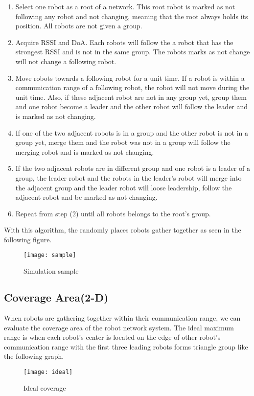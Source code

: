 \begin{enumerate}
	\item Select one robot as a root of a network. This root robot is marked as not following any robot and not changing, meaning that the root always holds its position. All robots are not given a group.
	\item Acquire RSSI and DoA. Each robots will follow the a robot that has the strongest RSSI and is not in the same group. The robots marks as not change will not change a following robot.
	\item Move robots towards a following robot for a unit time. If a robot is within a communication range of a following robot, the robot will not move during the unit time. Also, if these adjacent robot are not in any group yet, group them and one robot become a leader and the other robot will follow the leader and is marked as not changing.
	\item If one of the two adjacent robots is in a group and the other robot is not in a group yet, merge them and the robot was not in a group will follow the merging robot and is  marked as not changing.
	\item If the two adjacent robots are in different group and one robot is a leader of a group, the leader robot and the robots in the leader's robot will merge into the adjacent group and the leader robot will loose leadership, follow the adjacent robot and be marked as not changing.
	\item Repeat from step (2) until all robots belongs to the root's group.
\end{enumerate}

\par
With this algorithm, the randomly places robots gather together as seen in the following figure.
	
\begin{figure}[ht]
	\centering
	\texttt{[image: sample]}
	\caption{Simulation sample}
	\end{figure}


\subsection{Coverage Area(2-D)}
\par
When robots are gathering together within their communication range, we can evaluate the coverage area of the robot network 
system. The ideal maximum range is when each robot's center is located on the edge of other robot's communication range with the first three leading robots forms triangle group like the following graph.
\begin{figure}[ht]
	\centering
	\texttt{[image: ideal]}
	\caption{Ideal coverage}
	\end{figure}
	
